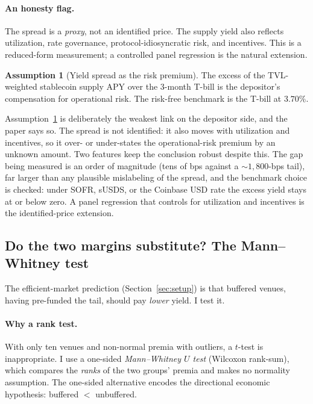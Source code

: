 \documentclass[11pt]{article}
\theoremstyle{definition}
\theoremstyle{remark}
\theoremstyle{definition}
\newtheorem{assumption}{Assumption}
\newcommand{\1}{\mathbf{1}}
\begin{document}
\paragraph{An honesty flag.}
The spread is a \emph{proxy}, not an identified price. The supply yield also
reflects utilization, rate governance, protocol-idiosyncratic risk, and
incentives. This is a reduced-form measurement; a controlled panel regression
is the natural extension.

\begin{assumption}[Yield spread as the risk premium]\label{as:yieldproxy}
The excess of the TVL-weighted stablecoin supply APY over the 3-month T-bill is
the depositor's compensation for operational risk. The risk-free benchmark is
the T-bill at $3.70\%$.
\end{assumption}

\noindent Assumption~\ref{as:yieldproxy} is deliberately the weakest link on the
depositor side, and the paper says so. The spread is not identified: it also
moves with utilization and incentives, so it over- or under-states the
operational-risk premium by an unknown amount. Two features keep the conclusion
robust despite this. The gap being measured is an order of magnitude (tens of
bps against a $\sim1{,}800$-bps tail), far larger than any plausible mislabeling
of the spread, and the benchmark choice is checked: under SOFR, sUSDS, or the
Coinbase USD rate the excess yield stays at or below zero. A panel regression
that controls for utilization and incentives is the identified-price extension.

\subsection{Do the two margins substitute? The Mann--Whitney test}\label{sec:mwtest}

The efficient-market prediction (Section~\ref{sec:setup}) is that buffered venues,
having pre-funded the tail, should pay \emph{lower} yield. I test it.

\paragraph{Why a rank test.}
With only ten venues and non-normal premia with outliers, a $t$-test is
inappropriate. I use a one-sided \emph{Mann--Whitney $U$ test} (Wilcoxon
rank-sum), which compares the \emph{ranks} of the two groups' premia and makes
no normality assumption. The one-sided alternative encodes the directional
economic hypothesis: buffered $<$ unbuffered.
\end{document}
